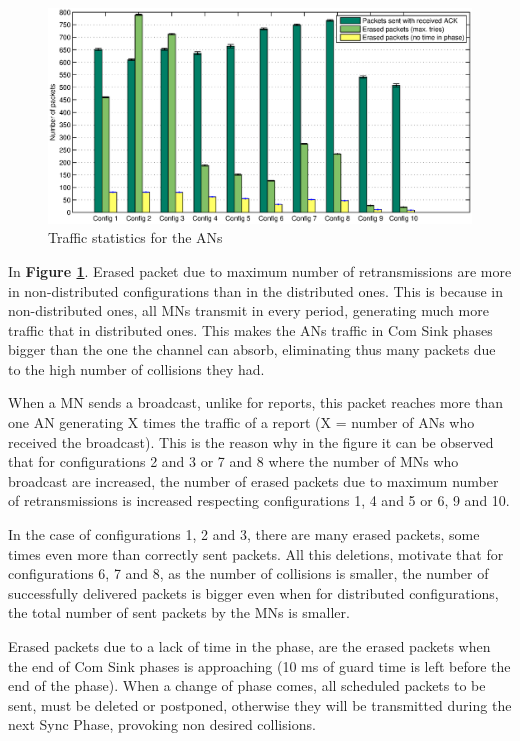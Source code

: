 \begin{figure}[ht]
 \begin{center}
  \includegraphics[width=1\textwidth]{packetsSentErasedNoTimeAN.eps}
 \end{center}
 \caption{Traffic statistics for the \acp{AN}}
 \label{fig:packetsSentErasedNoTimeAN}
\end{figure}

In \textbf{Figure \ref{fig:packetsSentErasedNoTimeAN}}. Erased packet due to maximum number of retransmissions are more in non-distributed 
configurations than in the distributed ones. This is because in non-distributed ones, all \acp{MN} transmit in every period, generating much more traffic
that in distributed ones. This makes the \acp{AN} traffic in Com Sink phases bigger than the one the channel can absorb, eliminating thus many packets 
due to the high number of collisions they had.

When a \ac{MN} sends a broadcast, unlike for reports, this packet reaches more than one \ac{AN} generating X times the traffic of a report (X = number of \acp{AN}
who received the broadcast). This is the reason why in the figure it can be observed that for configurations 2 and 3 or 7 and 8 where the number of 
\acp{MN} who broadcast are increased, the number of erased packets due to maximum number of retransmissions is increased respecting configurations
1, 4 and 5 or 6, 9 and 10.

In the case of configurations 1, 2 and 3, there are many erased packets, some times even more than correctly sent packets. All this deletions, motivate
that for configurations 6, 7 and 8, as the number of collisions is smaller, the number of successfully delivered packets is bigger even when for 
distributed configurations, the total number of sent packets by the \acp{MN} is smaller.

Erased packets due to a lack of time in the phase, are the erased packets when the end of Com Sink phases is approaching (10 ms of guard time is left
before the end of the phase). When a change of phase comes, all scheduled packets to be sent, must be deleted or postponed, otherwise they will be 
transmitted during the next Sync Phase, provoking non desired collisions.

